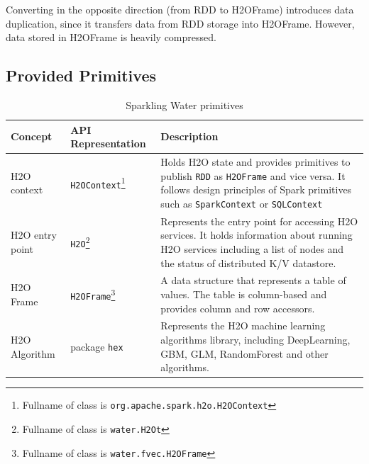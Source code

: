Converting in the opposite direction (from RDD to H2OFrame) introduces data duplication, since it transfers data from RDD storage into H2OFrame. However, data stored in H2OFrame is heavily compressed.

\subsection{Provided Primitives}

\begin{table}
\centering
\begin{tabularx}{\textwidth}{l l p{5.2cm}}
\toprule
Concept & API Representation & Description \\
\midrule
H2O context & \texttt{H2OContext}\footnote{Fullname of class is \texttt{org.apache.spark.h2o.H2OContext}} & Holds
H2O state and provides primitives to publish \texttt{RDD} as \texttt{H2OFrame} and
vice versa. It follows design principles of Spark primitives such as
\texttt{SparkContext} or \texttt{SQLContext} \\  \addlinespace

H2O entry point & \texttt{H2O}\footnote{Fullname of class is \texttt{water.H2Ot}} & Represents the entry point for accessing
H2O services. It holds information about running H2O services including a list of
nodes and the status of distributed K/V datastore. \\  \addlinespace

H2O Frame & \texttt{H2OFrame}\footnote{Fullname of class is \texttt{water.fvec.H2OFrame}} & A data structure that
represents a table of values. The table is column-based and provides column and
row accessors. \\  \addlinespace

H2O Algorithm & package \texttt{hex} & Represents the H2O machine learning
algorithms library, including DeepLearning, GBM, GLM, RandomForest and other
algorithms. \\

\bottomrule
\end{tabularx}
\caption{Sparkling Water primitives}
\label{tab:primitives}
\end{table}

